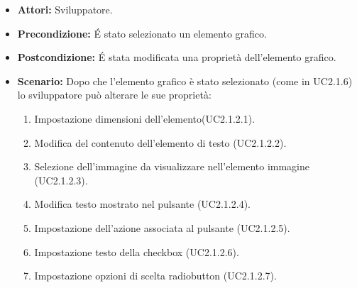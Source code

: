 \begin{itemize}
\item[]\textbf{Attori:} Sviluppatore. 
\item[]\textbf{Precondizione:} \'E stato selezionato un elemento grafico. 
\item[]\textbf{Postcondizione:} \'E stata modificata una proprietà dell'elemento grafico. 
\item[]\textbf{Scenario:}
Dopo che l'elemento grafico è stato selezionato (come in UC2.1.6) lo sviluppatore può alterare le sue proprietà:


\begin{enumerate}

\item Impostazione dimensioni dell'elemento(UC2.1.2.1).

\item Modifica del contenuto dell'elemento di testo (UC2.1.2.2).

\item Selezione dell'immagine da visualizzare nell'elemento immagine (UC2.1.2.3).

\item Modifica testo mostrato nel pulsante (UC2.1.2.4).

\item Impostazione dell'azione associata al pulsante (UC2.1.2.5).

\item Impostazione testo della checkbox (UC2.1.2.6).

\item Impostazione opzioni di scelta radiobutton (UC2.1.2.7).

\end{enumerate} 
\end{itemize}

